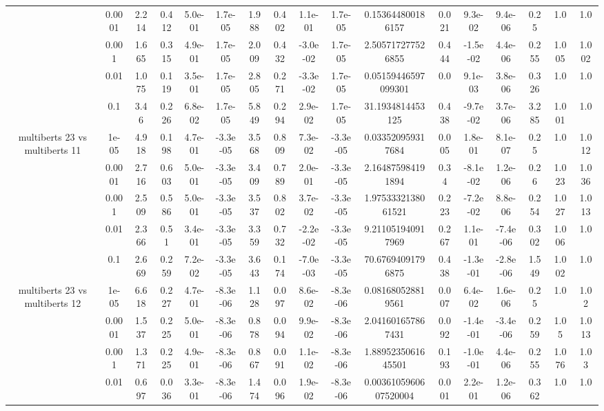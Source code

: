 \begin{tabular}{|c|c|c|c|c|c|c|c|c|c|c|c|c|c|c|c|c|}
 & 0.0001 & 2.214 & 0.412 & 5.0e-01 & 1.7e-05 & 1.988 & 0.402 & 1.1e-01 & 1.7e-05 & 0.153644800186157 & 0.021 & 9.3e-02 & 9.4e-06 & 0.25 & 1.0 & 1.0 \\
 & 0.001 & 1.665 & 0.315 & 4.9e-01 & 1.7e-05 & 2.009 & 0.432 & -3.0e-02 & 1.7e-05 & 2.505717277526855 & 0.444 & -1.5e-02 & 4.4e-06 & 0.255 & 1.005 & 1.002 \\
 & 0.01 & 1.075 & 0.119 & 3.5e-01 & 1.7e-05 & 2.805 & 0.271 & -3.3e-02 & 1.7e-05 & 0.05159446597099301 & 0.0 & 9.1e-03 & 3.8e-06 & 0.326 & 1.0 & 1.0 \\
 & 0.1 & 3.46 & 0.226 & 6.8e-02 & 1.7e-05 & 5.849 & 0.294 & 2.9e-02 & 1.7e-05 & 31.1934814453125 & 0.438 & -9.7e-02 & 3.7e-06 & 3.285 & 1.001 & 1.0 \\
\hline
\multirow{5}{*}{multiberts 23 vs multiberts 11} & 1e-05 & 4.918 & 0.198 & 4.7e-01 & -3.3e-05 & 3.568 & 0.809 & 7.3e-02 & -3.3e-05 & 0.033520959317684 & 0.005 & 1.8e-01 & 8.1e-07 & 0.25 & 1.0 & 1.012 \\
 & 0.0001 & 2.716 & 0.603 & 5.0e-01 & -3.3e-05 & 3.409 & 0.789 & 2.0e-01 & -3.3e-05 & 2.164875984191894 & 0.34 & -8.1e-02 & 1.2e-06 & 0.26 & 1.023 & 1.036 \\
 & 0.001 & 2.509 & 0.586 & 5.0e-01 & -3.3e-05 & 3.537 & 0.802 & 3.7e-02 & -3.3e-05 & 1.9753332138061521 & 0.223 & -7.2e-02 & 8.8e-06 & 0.254 & 1.027 & 1.013 \\
 & 0.01 & 2.366 & 0.51 & 3.4e-01 & -3.3e-05 & 3.359 & 0.732 & -2.2e-02 & -3.3e-05 & 9.211051940917969 & 0.267 & 1.1e-01 & -7.4e-06 & 0.302 & 1.006 & 1.0 \\
 & 0.1 & 2.669 & 0.259 & 7.2e-02 & -3.3e-05 & 3.643 & 0.174 & -7.0e-03 & -3.3e-05 & 70.67694091796875 & 0.438 & -1.3e-01 & -2.8e-06 & 1.549 & 1.002 & 1.0 \\
\hline
\multirow{5}{*}{multiberts 23 vs multiberts 12} & 1e-05 & 6.618 & 0.227 & 4.7e-01 & -8.3e-06 & 1.128 & 0.097 & 8.6e-02 & -8.3e-06 & 0.081680528819561 & 0.007 & 6.4e-02 & 1.6e-06 & 0.25 & 1.0 & 1.02 \\
 & 0.0001 & 1.537 & 0.225 & 5.0e-01 & -8.3e-06 & 0.878 & 0.094 & 9.9e-02 & -8.3e-06 & 2.041601657867431 & 0.092 & -1.4e-01 & -3.4e-06 & 0.259 & 1.05 & 1.013 \\
 & 0.001 & 1.371 & 0.225 & 4.9e-01 & -8.3e-06 & 0.867 & 0.091 & 1.1e-02 & -8.3e-06 & 1.8895235061645501 & 0.193 & -1.0e-01 & 4.4e-06 & 0.255 & 1.076 & 1.03 \\
 & 0.01 & 0.697 & 0.036 & 3.3e-01 & -8.3e-06 & 1.474 & 0.096 & 1.9e-02 & -8.3e-06 & 0.0036105960607520004 & 0.001 & 2.2e-01 & 1.2e-06 & 0.362 & 1.0 & 1.0 \\

\end{tabular}
